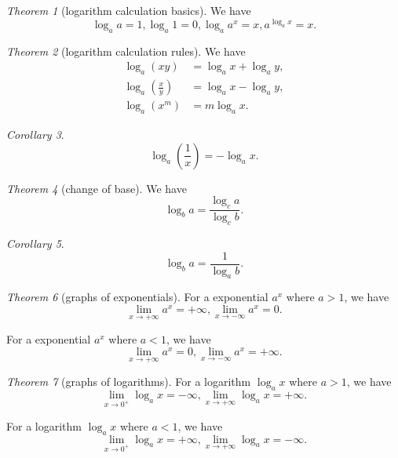 \documentclass[8pt]{article}
\theoremstyle{remark}
\newtheorem{theorem}{Theorem}[section]
\newtheorem{corollary}[theorem]{Corollary}
\begin{document}
        \begin{theorem}[logarithm calculation basics]
            We have
            $$
                \log_a a = 1, \log_a 1 = 0, \log_a a^x = x, a^{\log_a x} = x.
            $$
        \end{theorem}

        \begin{theorem}[logarithm calculation rules]
            We have
            \begin{align*}
                \log_a (xy) &= \log_a x + \log_a y, \\
                \log_a \left(\frac{x}{y}\right) &= \log_a x - \log_a y,\\
                \log_a (x^m) &= m \log_a x.
            \end{align*}
        \end{theorem}

        \begin{corollary}
            $$
            \log_a \left(\frac{1}{x}\right) = - \log_a x.
            $$
        \end{corollary}

        \begin{theorem}[change of base]
            We have
            $$
                \log_b a = \frac{\log_c a}{\log_c b}.
            $$
        \end{theorem}
        
        \begin{corollary}
            $$
                \log_b a = \frac{1}{\log_a b}.
            $$
        \end{corollary}

        \begin{theorem}[graphs of exponentials]
            For a exponential $a^x$ where $a > 1$, we have
            $$
                \lim_{x \rightarrow +\infty} a^x = +\infty, \lim_{x \rightarrow -\infty} a^x = 0.
            $$

            For a exponential $a^x$ where $a < 1$, we have
            $$
                \lim_{x \rightarrow +\infty} a^x = 0, \lim_{x \rightarrow -\infty} a^x = +\infty.
            $$
        \end{theorem}

        \begin{theorem}[graphs of logarithms]
            For a logarithm $\log_a x$ where $a > 1$, we have
            $$
                \lim_{x \rightarrow 0^+} \log_a x = -\infty, \lim_{x \rightarrow +\infty} \log_a x = +\infty.
            $$ 

            For a logarithm $\log_a x$ where $a < 1$, we have
            $$
                \lim_{x \rightarrow 0^+} \log_a x = +\infty, \lim_{x \rightarrow +\infty} \log_a x = -\infty.
            $$
        \end{theorem}
\end{document}
